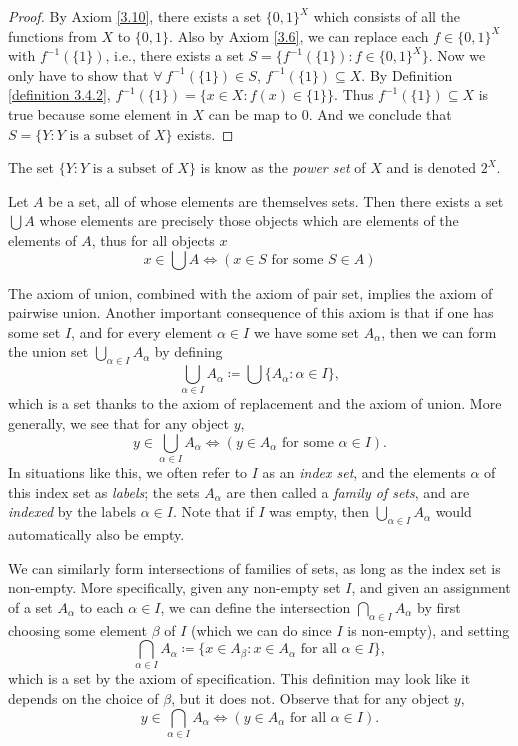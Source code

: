 \begin{proof}
By Axiom \ref{3.10}, there exists a set \(\{0, 1\}^X\) which consists of all the functions from \(X\) to \(\{0, 1\}\).
Also by Axiom \ref{3.6}, we can replace each \(f \in \{0, 1\}^X\) with \(f^{-1}(\{1\})\), i.e., there exists a set \(S = \{f^{-1}(\{1\}) : f \in \{0, 1\}^X\}\).
Now we only have to show that \(\forall\ f^{-1}(\{1\}) \in S\), \(f^{-1}(\{1\}) \subseteq X\).
By Definition \ref{definition 3.4.2}, \(f^{-1}(\{1\}) = \{x \in X : f(x) \in \{1\}\}\).
Thus \(f^{-1}(\{1\}) \subseteq X\) is true because some element in \(X\) can be map to \(0\).
And we conclude that \(S = \{Y : Y \text{ is a subset of } X\}\) exists.
\end{proof}

\begin{remark}
The set \(\{Y : Y \text{ is a subset of } X\}\) is know as the \emph{power set} of \(X\) and is denoted \(2^X\).
\end{remark}

\begin{axiom}[Union]\label{3.11}
Let \(A\) be a set, all of whose elements are themselves sets.
Then there exists a set \(\bigcup A\) whose elements are precisely those objects which are elements of the elements of \(A\), thus for all objects \(x\)
\[
    x \in \bigcup A \iff (x \in S \text{ for some } S \in A)
\]
\end{axiom}

The axiom of union, combined with the axiom of pair set, implies the axiom of pairwise union.
Another important consequence of this axiom is that if one has some set \(I\), and for every element \(\alpha \in I\) we have some set \(A_{\alpha}\), then we can form the union set \(\bigcup_{\alpha \in I} A_{\alpha}\) by defining
\[
    \bigcup_{\alpha \in I} A_{\alpha} \coloneqq \bigcup \{A_{\alpha} : \alpha \in I\},
\]
which is a set thanks to the axiom of replacement and the axiom of union.
More generally, we see that for any object \(y\),
\[
    y \in \bigcup_{\alpha \in I} A_{\alpha} \iff (y \in A_{\alpha} \text{ for some } \alpha \in I).
\]
In situations like this, we often refer to \(I\) as an \emph{index set}, and the elements \(\alpha\) of this index set as \emph{labels};
the sets \(A_{\alpha}\) are then called a \emph{family of sets}, and are \emph{indexed} by the labels \(\alpha \in I\).
Note that if \(I\) was empty, then \(\bigcup_{\alpha \in I} A_{\alpha}\) would automatically also be empty.

We can similarly form intersections of families of sets, as long as the index set is non-empty.
More specifically, given any non-empty set \(I\), and given an assignment of a set \(A_{\alpha}\) to each \(\alpha \in I\), we can define the intersection \(\bigcap_{\alpha \in I} A_{\alpha}\) by first choosing some element \(\beta\) of \(I\) (which we can do since \(I\) is non-empty), and setting
\[
    \bigcap_{\alpha \in I} A_{\alpha} \coloneqq \{x \in A_{\beta} : x \in A_{\alpha} \text{ for all } \alpha \in I\},
\]
which is a set by the axiom of specification.
This definition may look like it depends on the choice of \(\beta\), but it does not.
Observe that for any object \(y\),
\[
    y \in \bigcap_{\alpha \in I} A_{\alpha} \iff (y \in A_{\alpha} \text{ for all } \alpha \in I).
\]

